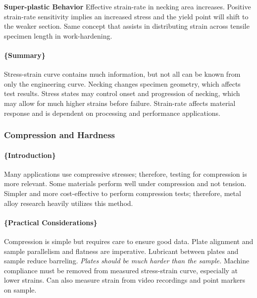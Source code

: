 \documentclass[
]{article}
\begin{document}
\textbf{Super-plastic Behavior} Effective strain-rate in necking area
increases. Positive strain-rate sensitivity implies an increased stress
and the yield point will shift to the weaker section. Same concept that
assists in distributing strain across tensile specimen length in
work-hardening.

\hypertarget{summary-4}{%
\paragraph{\{Summary\}}\label{summary-4}}

Stress-strain curve contains much information, but not all can be known
from only the engineering curve. Necking changes specimen geometry,
which affects test results. Stress states may control onset and
progression of necking, which may allow for much higher strains before
failure. Strain-rate affects material response and is dependent on
processing and performance applications.

\hypertarget{compression-and-hardness}{%
\subsubsection{Compression and
Hardness}\label{compression-and-hardness}}

\hypertarget{introduction-6}{%
\paragraph{\{Introduction\}}\label{introduction-6}}

Many applications use compressive stresses; therefore, testing for
compression is more relevant. Some materials perform well under
compression and not tension. Simpler and more cost-effective to perform
compression tests; therefore, metal alloy research heavily utilizes this
method.

\hypertarget{practical-considerations}{%
\paragraph{\{Practical
Considerations\}}\label{practical-considerations}}

Compression is simple but requires care to ensure good data. Plate
alignment and sample parallelism and flatness are imperative. Lubricant
between plates and sample reduce barreling.
\textit{Plates should be much harder than the sample.} Machine
compliance must be removed from measured stress-strain curve, especially
at lower strains. Can also measure strain from video recordings and
point markers on sample.
\end{document}
